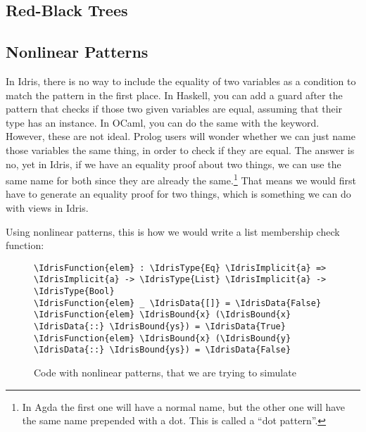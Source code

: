 

\subsection{Red-Black Trees}\label{ssec:rbt}



\subsection{Nonlinear Patterns}

In Idris, there is no way to include the equality of two variables as a condition to match the pattern in the first place.
In Haskell, you can add a guard after the pattern that checks if those two
given variables are equal, assuming that their type has an  instance.
In OCaml, you can do the same with the  keyword.
However, these are not ideal. Prolog users will wonder whether we can just name
those variables the same thing, in order to check if they are equal. The answer
is no, yet in Idris, if we have an equality proof about two things, we can use
the same name for both since they are already the same.\footnote{In Agda the first one will have a normal name, but the other one will have the same name prepended with a dot. This is called a ``dot pattern''.} That means we would
first have to generate an equality proof for two things, which is something we
can do with views in Idris.

Using nonlinear patterns, this is how we would write a list membership check
function:

\begin{figure}[ht]
\caption{Code with nonlinear patterns, that we are trying to simulate}
\label{code:nonlinear}
\begin{Verbatim}
\IdrisFunction{elem} : \IdrisType{Eq} \IdrisImplicit{a} => \IdrisImplicit{a} -> \IdrisType{List} \IdrisImplicit{a} -> \IdrisType{Bool}
\IdrisFunction{elem} _ \IdrisData{[]} = \IdrisData{False}
\IdrisFunction{elem} \IdrisBound{x} (\IdrisBound{x} \IdrisData{::} \IdrisBound{ys}) = \IdrisData{True}
\IdrisFunction{elem} \IdrisBound{x} (\IdrisBound{y} \IdrisData{::} \IdrisBound{ys}) = \IdrisData{False}
\end{Verbatim}
\end{figure}

